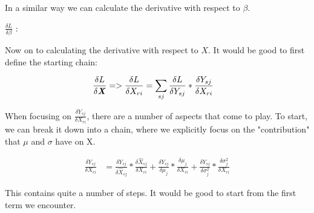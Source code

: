 \vspace{1cm}
In a similar way we can calculate the derivative with respect to $\beta$.

{\Large $\frac{\delta L}{\delta \beta}$ }:

\vspace{1cm}
Now on to calculating the derivative with respect to $X$. It would be good to first define the starting chain:

\begin{align}
    \frac{\delta L}{\delta \textbf{\emph{X}}}
    &=> \frac{\delta L}{\delta X_{ri}}
    = \sum_{sj} \frac{\delta L}{\delta Y_{sj}} * \frac{\delta Y_{sj}}{\delta X_{ri}}
\end{align}

When focusing on $\frac{\delta Y_{sj}}{\delta X_{ri}}$, there are a number of aspects that come to play. 
To start, we can break it down into a chain, where we explicitly focus on the "contribution"
that $\mu$ and $\sigma$ have on X.

\begin{align}
    \frac{\delta Y_{sj}}{\delta X_{ri}} &= 
        \frac{\delta Y_{sj}}{\delta \hat{X}_{sj}} * \frac{\delta \hat{X}_{sj}}{\delta X_{ri}}
            + \frac{\delta Y_{sj}}{\delta \mu_j} * \frac{\delta \mu_j}{\delta X_{ri}}
            + \frac{\delta Y_{sj}}{\delta \sigma^2_j} * \frac{\delta \sigma^2_j}{\delta X_{ri}}
\end{align}

This contains quite a number of steps. It would be good to start from the first term we encounter.

